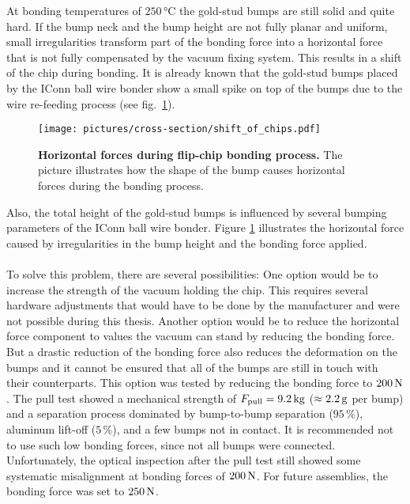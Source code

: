At bonding temperatures of $250\,\si{\degreeCelsius}$ the gold-stud bumps are still solid and quite hard. If the bump neck and the bump height are not fully planar and uniform, small irregularities transform part of the bonding force into a horizontal force that is not fully compensated by the vacuum fixing system. This results in a shift of the chip during bonding. It is already known that the gold-stud bumps placed by the IConn ball wire bonder show a small spike on top of the bumps due to the wire re-feeding process (see fig.~\ref{pic:chip_shift}).
\begin{figure}
\begin{center}
\texttt{[image: pictures/cross-section/shift\_of\_chips.pdf]}
\end{center}
\caption[Horizontal forces during flip-chip bonding process]{\textbf{Horizontal forces during flip-chip bonding process.} The picture illustrates how the shape of the bump causes horizontal forces during the bonding process.}\label{pic:chip_shift}
\end{figure}
Also, the total height of the gold-stud bumps is influenced by several bumping parameters of the IConn ball wire bonder. Figure \ref{pic:chip_shift} illustrates the horizontal force caused by irregularities in the bump height and the bonding force applied.\\
\\To solve this problem, there are several possibilities: One option would be to increase the strength of the vacuum holding the chip. This requires several hardware adjustments that would have to be done by the manufacturer and were not possible during this thesis. Another option would be to reduce the horizontal force component to values the vacuum can stand by reducing the bonding force. But a drastic reduction of the bonding force also reduces the deformation on the bumps and it cannot be ensured that all of the bumps are still in touch with their counterparts. This option was tested by reducing the bonding force to $200\,\rm{N}$. The pull test showed a mechanical strength of $F_{\rm{pull}}=9.2\,\rm{kg}$ ($\approx 2.2 \,\rm{g}$ per bump) and a separation process dominated by bump-to-bump separation ($95\,\%$), aluminum lift-off ($5\,\%$), and a few bumps not in contact. It is recommended not to use such low bonding forces, since not all bumps were connected. Unfortunately, the optical inspection after the pull test still showed some systematic misalignment at bonding forces of $200\,\rm{N}$. For future assemblies, the bonding force was set to $250\,\rm{N}$.

